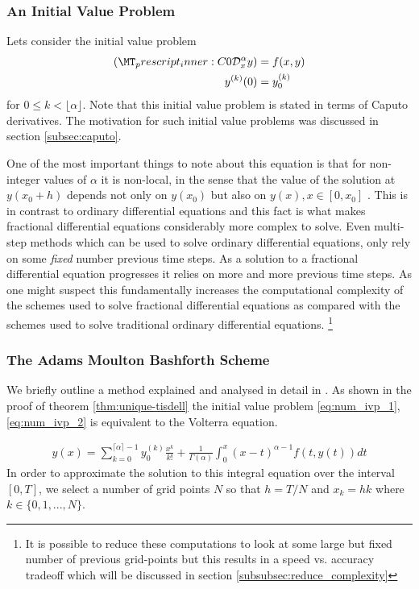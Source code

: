 \subsubsection{An Initial Value Problem}
Lets consider the initial value problem
\begin{align}
    \label{eq:num_ivp_1}
    \capder{0}{x}{\alpha}{y} &= f(x,y) \\
    \label{eq:num_ivp_2}
    y^{(k)}(0) &= y_{0}^{(k)} 
\end{align}
for $ 0 \leq k < \lfloor \alpha \rfloor $. Note that this initial value problem is stated in terms of Caputo derivatives. The motivation for such initial value problems was discussed in section \ref{subsec:caputo}.

One of the most important things to note about this equation is that for non-integer values of $ \alpha $ it is non-local, in the sense that the value of the solution at $ y(x_0+h) $ depends not only on $ y(x_0) $ but also on $ y(x), x \in [0, x_0] $ \cite{Diethelm2010}. This is in contrast to ordinary differential equations and this fact is what makes fractional differential equations considerably more complex to solve. Even multi-step methods which can be used to solve ordinary differential equations, only rely on some \emph{fixed} number previous time steps. As a solution to a fractional differential equation progresses it relies on more and more previous time steps. As one might suspect this fundamentally increases the computational complexity of the schemes used to solve fractional differential equations as compared with the schemes used to solve traditional ordinary differential equations. \footnote{It is possible to reduce these computations to look at some large but fixed number of previous grid-points 
but this results in a speed vs. accuracy tradeoff which will be discussed in section \ref{subsubsec:reduce_complexity}}

\subsubsection{The Adams Moulton Bashforth Scheme}
\label{sec:amb_desc}
We briefly outline a method explained and analysed in detail in \cite{Diethelm2004}. As shown in the proof of theorem \ref{thm:unique-tisdell} the initial value problem \eqref{eq:num_ivp_1}, \eqref{eq:num_ivp_2} is equivalent to the Volterra equation.

\begin{align}
    \label{eq:num_int_eq}
    y(x) = \sum_{k=0}^{\lceil \alpha \rceil - 1} y_{0}^{(k)} \frac{x^k}{k!} + \frac{1}{\Gamma(\alpha)} \int_0^x (x-t)^{\alpha - 1} f(t, y(t))dt
\end{align}
In order to approximate the solution to this integral equation over the interval $ [0, T] $, we select a number of grid points $ N $ so that $ h = T / N $ and $ x_k = hk $ where $ k \in \{0, 1, ..., N\} $.

